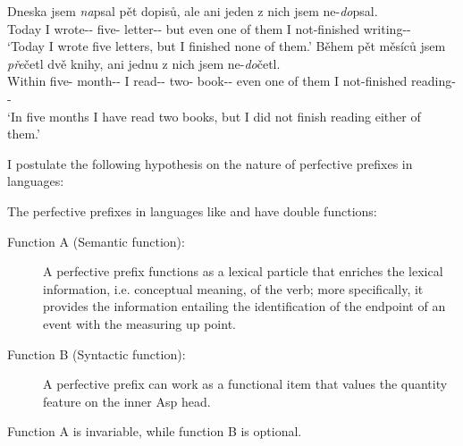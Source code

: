 \documentclass[output=paper]{langsci/langscibook}
\begin{document}
\begin{exe}
\ex {} \begin{xlist}
    \ex \gll Dneska jsem \textit{na}psal p\v{e}t dopis\r{u}, \llap{*}ale ani jeden z nich jsem ne-\textit{do}psal. \\
        Today I {wrote-\Pfv{}-\Sg{}{}} {five-\Acc{}} {letter-\Pl{}-\Poss{}} but even one of them I {not-finished writing-\Pfv{}-\Sg{}} \\
        \glt \enquote*{Today I wrote five letters, but I finished none of them.}
    \ex \gll B\v{e}hem p\v{e}t m\v{e}s\'ic\r{u} jsem \textit{pře}četl dv\v{e}
    knihy, \llap{*}ani jednu z nich jsem ne-\textit{do}četl.\\
        Within {five-\Poss{}} {month-\Pl{}-\Poss{}} I {read-\Pfv{}-\Sg{}{}} {two-\Acc{}} {book-\Pl{}-\Acc{}} even one of them I {not-finished reading-\Pfv{}-\Sg{}} \\
        \glt \enquote*{In five months I have read two books, but I did not finish reading either of them.}
    \end{xlist}
\end{exe}

I postulate the following hypothesis on the nature of perfective prefixes in  languages:

\begin{exe}
\ex\label{perf hypo} The perfective prefixes in  languages like  and  have double functions:
    \begin{description}
        \item[Function A (Semantic function):] A 
            perfective prefix functions as a lexical particle that enriches the
            lexical information, i.e. conceptual meaning, of the verb; more
            specifically, it provides the information entailing the
            identification of the endpoint of an event with the measuring up
            point.
        \item[Function B (Syntactic function):] A  perfective prefix can work as a functional item that values the quantity feature on the inner Asp head.
    \end{description}
    Function A is invariable, while function B is optional.
\end{exe}
\end{document}
